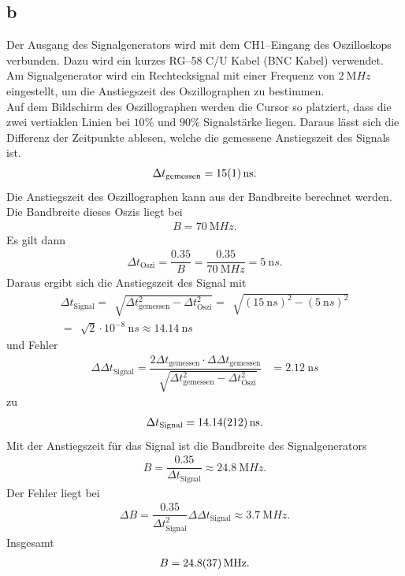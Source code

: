 \documentclass[a4paper,10pt]{article}
\numberwithin{equation}{section}
\begin{document}
\subsection{b}
Der Ausgang des Signalgenerators wird mit dem CH1--Eingang des Oszilloskops verbunden.
Dazu wird ein kurzes RG--58 C/U Kabel (BNC Kabel) verwendet.
Am Signalgenerator wird ein Rechtecksignal mit einer Frequenz von $\SI{2}{\mega Hz}$ eingestellt, um die Anstiegszeit des Oszillographen zu bestimmen.
\\\indent Auf dem Bildschirm des Oszillographen werden die Cursor so platziert, dass die zwei vertiaklen Linien bei $10\%$ und $90\%$ Signalstärke liegen.
Daraus lässt sich die Differenz der Zeitpunkte ablesen, welche die gemessene Anstiegszeit des Signals ist.
\begin{align} 
        \Delta t_\text{gemessen}=\SI{15+-1}{\nano s}
.\end{align} 
Die Anstiegszeit des Oszillographen kann aus der Bandbreite berechnet werden.
Die Bandbreite dieses Oszis liegt bei 
\begin{align} 
        B=\SI{70}{\mega Hz}
.\end{align} 
Es gilt dann
\begin{align} 
        \Delta t_\text{Oszi}=\dfrac{0.35}{B}=\dfrac{0.35}{\SI{70}{\mega Hz}}=\SI{5}{\nano s}
.\end{align} 
Daraus ergibt sich die Anstiegszeit des Signal mit
\begin{multline} 
        \Delta t_\text{Signal}=\,\sqrt[]{\Delta t_\text{gemessen}^2-\Delta t_\text{Oszi}^2}=\,\sqrt[]{\left(\SI{15}{\nano s}\right)^2-\left(\SI{5}{\nano s}\right)^2}\\=\,\sqrt[]{2}\cdot 10^{-8}\SI{}{\nano s}\approx \SI{14.14}{\nano s}
\end{multline} 
und Fehler
\begin{align} 
        \Delta \Delta t_\text{Signal}=\dfrac{2\Delta t_\text{gemessen}\cdot \Delta \Delta t_\text{gemessen}}{\,\sqrt[]{\Delta t_\text{gemessen}^2-\Delta t_\text{Oszi}^2}}&=\SI{2.12}{\nano s}
\end{align} 
zu
\begin{align} 
        \Delta t_\text{Signal}=\SI{14.14+-2.12}{\nano s}
.\end{align} 
Mit der Anstiegszeit für das Signal ist die Bandbreite des Signalgenerators
\begin{align} 
        B=\dfrac{0.35}{\Delta t_\text{Signal}}\approx \SI{24.8}{\mega Hz}
.\end{align} 
Der Fehler liegt bei
\begin{align} 
        \Delta B=\dfrac{0.35}{\Delta t_\text{Signal}^2}\Delta \Delta t_\text{Signal}\approx \SI{3.7}{\mega Hz}
.\end{align} 
Insgesamt
\begin{align} 
        B=\SI{24.8+-3.7}{\mega Hz}
.\end{align} 
\end{document}
